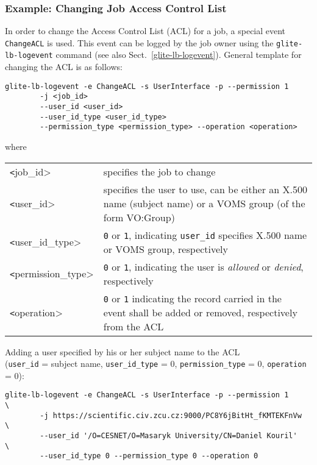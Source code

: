 \subsubsection{Example: Changing Job Access Control List}
\label{e:change-acl}

In order to change the Access Control List (ACL) for a job, a special event
\verb'ChangeACL' is used. This event can be logged by the job owner using the
\verb'glite-lb-logevent' command (see also Sect.~\ref{glite-lb-logevent}).
General template for changing the ACL is as follows:

\begin{verbatim}
glite-lb-logevent -e ChangeACL -s UserInterface -p --permission 1          
        -j <job_id>                                                     
        --user_id <user_id>                                             
        --user_id_type <user_id_type>                                   
        --permission_type <permission_type> --operation <operation>
\end{verbatim}

where

\begin{tabularx}{\textwidth}{>{\texttt}lX}
<job\_id>    & specifies the job to change \\
<user\_id>   & specifies the user to use, can be either an X.500 name
               (subject name) or a VOMS group (of the form VO:Group)\\
<user\_id\_type>   & \texttt{0} or \texttt{1}, indicating \texttt{user\_id}
                     specifies X.500 name or VOMS group, respectively \\
<permission\_type> & \texttt{0} or \texttt{1}, indicating the user is 
                     \textit{allowed} or \textit{denied}, respectively \\
<operation>  & \texttt{0} or \texttt{1} indicating the record carried in
               the event shall be added or removed, respectively from
               the ACL \\
\end{tabularx}


Adding a user specified by his or her subject name to the ACL \\
(\verb'user_id' = subject name, \verb'user_id_type' = 0, 
\verb'permission_type' = 0, \verb'operation' = 0):

\begin{verbatim}
glite-lb-logevent -e ChangeACL -s UserInterface -p --permission 1       \
        -j https://scientific.civ.zcu.cz:9000/PC8Y6jBitHt_fKMTEKFnVw    \
        --user_id '/O=CESNET/O=Masaryk University/CN=Daniel Kouril'     \
        --user_id_type 0 --permission_type 0 --operation 0
\end{verbatim}


